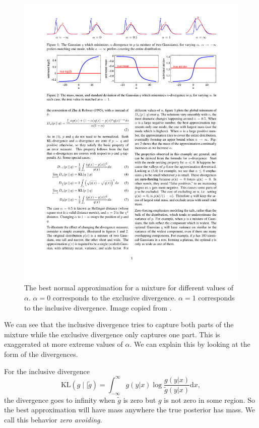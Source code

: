 \documentclass[12pt,vu]{adammath}
\newcommand\kl[2]{{\text{KL}({#1} \mid\mid {#2})}}
\theoremstyle{plain}
\theoremstyle{definition}
\theoremstyle{remark}
\begin{document}
\begin{figure}\label{f:minka}
  \includegraphics[width=\textwidth]{figures/from-minka-divergence.pdf}
  \caption{The best normal approximation for a mixture for different values of $\alpha$.
    $\alpha = 0$ corresponds to the exclusive divergence.
    $\alpha = 1$ corresponds to the inclusive divergence.
    Image copied from \cite{minkadiv}.}
\end{figure}

We can see that the inclusive divergence tries to capture both parts of the mixture while the exclusive divergence only captures one part.
This is exaggerated at more extreme values of $\alpha$.
We can explain this by looking at the form of the divergences.

For the inclusive divergence
$$\kl{g}{\tilde{g}} = \int_{-\infty}^\infty g(y|x) \log \frac{g(y|x)}{\tilde{g}(y|x)} \mathrm{d}x,$$
the divergence goes to infinity when $\tilde{g}$ is zero but $g$ is not zero in some region.
So the best approximation will have mass anywhere the true posterior has mass.
We call this behavior \emph{zero avoiding}.
\end{document}
